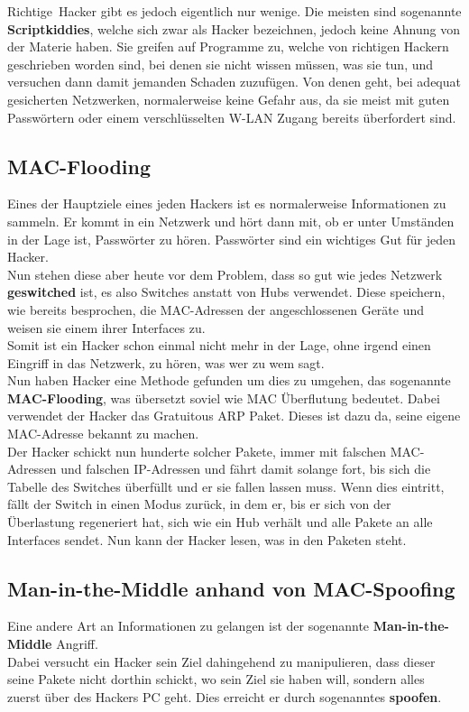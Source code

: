 \documentclass[12pt,a4paper]{report}
\begin{document}
\begin{onehalfspace}
\glqq Richtige\grqq \ Hacker gibt es jedoch eigentlich nur wenige. Die meisten sind sogenannte \textbf{Scriptkiddies}, welche sich zwar als Hacker bezeichnen, jedoch keine Ahnung von der Materie haben. Sie greifen auf Programme zu, welche von richtigen Hackern geschrieben worden sind, bei denen sie nicht wissen müssen, was sie tun, und versuchen dann damit jemanden Schaden zuzufügen. Von denen geht, bei adequat gesicherten Netzwerken, normalerweise keine Gefahr aus, da sie meist mit guten Passwörtern oder einem verschlüsselten W-LAN Zugang bereits überfordert sind.

\subsection{MAC-Flooding}\label{ssec:mflood}
Eines der Hauptziele eines jeden Hackers ist es normalerweise Informationen zu sammeln. Er kommt in ein Netzwerk und hört dann mit, ob er unter Umständen in der Lage ist, Passwörter zu hören. Passwörter sind ein wichtiges Gut für jeden Hacker.\\
Nun stehen diese aber heute vor dem Problem, dass so gut wie jedes Netzwerk \textbf{geswitched} ist, es also Switches anstatt von Hubs verwendet. Diese speichern, wie bereits besprochen, die MAC-Adressen der angeschlossenen Geräte und weisen sie einem ihrer Interfaces zu.\\
Somit ist ein Hacker schon einmal nicht mehr in der Lage, ohne irgend einen Eingriff in das Netzwerk, zu hören, was wer zu wem sagt.\\

Nun haben Hacker eine Methode gefunden um dies zu umgehen, das sogenannte \textbf{MAC-Flooding}, was übersetzt soviel wie MAC Überflutung bedeutet. Dabei verwendet der Hacker das Gratuitous ARP Paket. Dieses ist dazu da, seine eigene MAC-Adresse bekannt zu machen.\\
Der Hacker schickt nun hunderte solcher Pakete, immer mit falschen MAC-Adressen und falschen IP-Adressen und fährt damit solange fort, bis sich die Tabelle des Switches überfüllt und er sie fallen lassen muss. Wenn dies eintritt, fällt der Switch in einen Modus zurück, in dem er, bis er sich von der Überlastung regeneriert hat, sich wie ein Hub verhält und alle Pakete an alle Interfaces sendet. Nun kann der Hacker lesen, was in den Paketen steht.\\

\subsection{Man-in-the-Middle anhand von MAC-Spoofing}\label{ssec:mspoof}
Eine andere Art an Informationen zu gelangen ist der sogenannte \textbf{Man-in-the-Middle} Angriff.\\
Dabei versucht ein Hacker sein Ziel dahingehend zu manipulieren, dass dieser seine Pakete nicht dorthin schickt, wo sein Ziel sie haben will, sondern alles zuerst über des Hackers PC geht. Dies erreicht er durch sogenanntes \textbf{spoofen}.\\


\end{onehalfspace}
\end{document}
